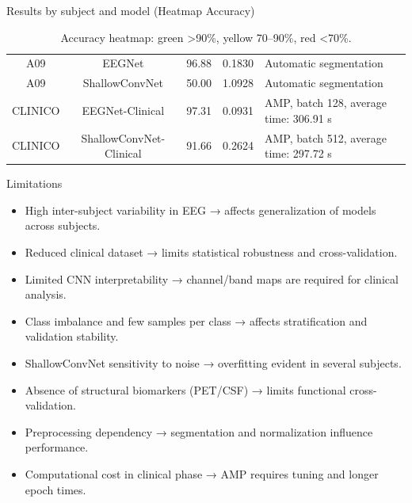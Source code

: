 \documentclass{beamer}
\begin{document}
\begin{frame}{Results by subject and model (Heatmap Accuracy)}
\begin{table}[htbp]
{\begin{tabular}{|c|c|c|c|p{5cm}|}
A09 & EEGNet & \cellcolor{green!30}96.88 & 0.1830 & Automatic segmentation \\
A09 & ShallowConvNet & \cellcolor{red!30}50.00 & 1.0928 & Automatic segmentation \\
CLINICO & EEGNet-Clinical & \cellcolor{green!30}97.31 & 0.0931 & AMP, batch 128, average time: 306.91 s \\
CLINICO & ShallowConvNet-Clinical & \cellcolor{green!30}91.66 & 0.2624 & AMP, batch 512, average time: 297.72 s \\
\hline
\end{tabular}
}
\caption{\tiny Accuracy heatmap: green >90\%, yellow 70–90\%, red <70\%.}
\end{table}
\end{frame}


\begin{frame}{Limitations}
  \begin{itemize}
  \item High inter-subject variability in EEG → affects generalization of models across subjects.
  \item Reduced clinical dataset → limits statistical robustness and cross-validation.
  \item Limited CNN interpretability → channel/band maps are required for clinical analysis.
  \item Class imbalance and few samples per class → affects stratification and validation stability.
  \item ShallowConvNet sensitivity to noise → overfitting evident in several subjects.
  \item Absence of structural biomarkers (PET/CSF) → limits functional cross-validation.
  \item Preprocessing dependency → segmentation and normalization influence performance.
  \item Computational cost in clinical phase → AMP requires tuning and longer epoch times.
\end{itemize}
\end{frame}

\end{document}
